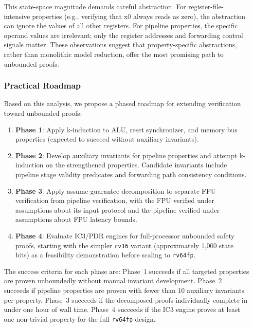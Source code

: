 \documentclass[journal]{IEEEtran}
\begin{document}
This state-space magnitude demands careful abstraction.  For
register-file-intensive properties (e.g., verifying that x0 always reads
as zero), the abstraction can ignore the values of all other registers.
For pipeline properties, the specific operand values are irrelevant;
only the register addresses and forwarding control signals matter.
These observations suggest that property-specific abstractions, rather
than monolithic model reduction, offer the most promising path to
unbounded proofs.

\subsubsection{Practical Roadmap}
Based on this analysis, we propose a phased roadmap for extending
verification toward unbounded proofs:
\begin{enumerate}[leftmargin=*]
\item \textbf{Phase 1}: Apply k-induction to ALU, reset synchronizer,
      and memory bus properties (expected to succeed without auxiliary
      invariants).
\item \textbf{Phase 2}: Develop auxiliary invariants for pipeline
      properties and attempt k-induction on the strengthened properties.
      Candidate invariants include pipeline stage validity predicates
      and forwarding path consistency conditions.
\item \textbf{Phase 3}: Apply assume-guarantee decomposition to
      separate FPU verification from pipeline verification, with the
      FPU verified under assumptions about its input protocol and the
      pipeline verified under assumptions about FPU latency bounds.
\item \textbf{Phase 4}: Evaluate IC3/PDR engines for full-processor
      unbounded safety proofs, starting with the simpler \texttt{rv16}
      variant (approximately 1,000 state bits) as a feasibility
      demonstration before scaling to \texttt{rv64fp}.
\end{enumerate}

The success criteria for each phase are: Phase~1 succeeds if all
targeted properties are proven unboundedly without manual invariant
development.  Phase~2 succeeds if pipeline properties are proven with
fewer than 10 auxiliary invariants per property.  Phase~3 succeeds if
the decomposed proofs individually complete in under one hour of wall
time.  Phase~4 succeeds if the IC3 engine proves at least one
non-trivial property for the full \texttt{rv64fp} design.
\end{document}

